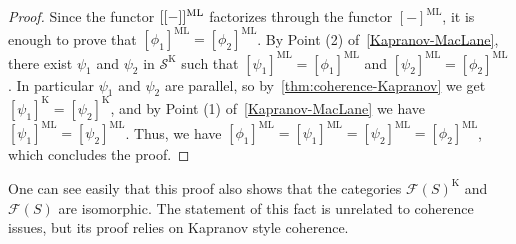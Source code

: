 {\begin{thm}
\end{thm}
\begin{proof} 
Since the functor $[[-]]^{\mathrm{ML}}$ factorizes through the functor $[-]^{\mathrm{ML}}$, it is enough to prove that $[\phi_1]^{\mathrm{ML}}=
[\phi_2]^{\mathrm{ML}}$. 
By Point (2) of~\cref{Kapranov-MacLane}, there exist $\psi_1$ and $\psi_2$ in $\mathcal{S}^{\mathrm{K}}$ such that $[\psi_1]^{\mathrm{ML}}=[\phi_1]^{\mathrm{ML}}$ and 
$[\psi_2]^{\mathrm{ML}}=[\phi_2]^{\mathrm{ML}}$.
In particular $\psi_1$ and $\psi_2$ are parallel, so by~\cref{thm:coherence-Kapranov} we get $[\psi_1]^{\mathrm{K}}=[\psi_2]^{\mathrm{K}}$, and by Point (1) of~\cref{Kapranov-MacLane} we have $[\psi_1]^{\mathrm{ML}}=[\psi_2]^{\mathrm{ML}}$.
Thus, we have $[\phi_1]^{\mathrm{ML}} = [\psi_1]^{\mathrm{ML}} =  [\psi_2]^{\mathrm{ML}} =  [\phi_2]^{\mathrm{ML}}$, which concludes the proof.
\end{proof}
\begin{rem}
One can see easily that this proof  also shows that the categories  $\mathcal{F}(S)^{\mathrm{K}}$ and~$\mathcal{F}(S)$ are isomorphic.  
The statement of this fact is unrelated to coherence issues, but  its proof relies on Kapranov style coherence.
\end{rem}}
